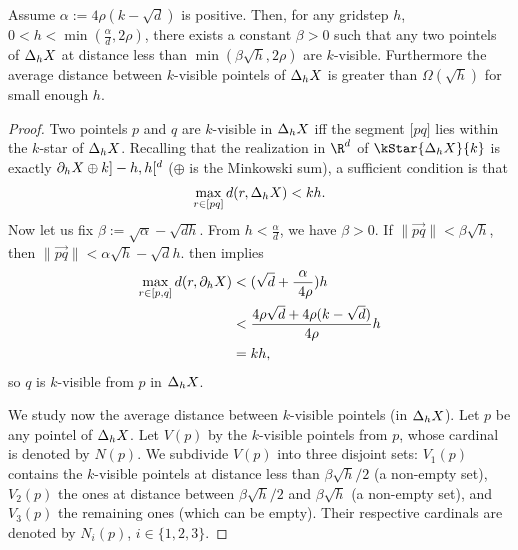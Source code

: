 \begin{theorem}
    \label{thm-k-visibility-distance}
    Assume $\alpha:=4\rho(k-\sqrt{d})$ is positive. Then, for any
    gridstep $h$, $0< h < \min(\frac{\alpha}{d}, 2\rho)$, there exists a
    constant $\beta >0 $ such that any two pointels of $\Delta_{h} {X}$ at
    distance less than $\min(\beta \sqrt{h},2\rho)$ are $k$-visible.
    Furthermore the average distance between $k$-visible pointels of
    $\Delta_{h} {X}$ is greater than $\Omega(\sqrt{h})$ for small enough
    $h$.
\end{theorem}
\begin{proof}
    Two pointels $p$ and $q$ are $k$-visible in $\Delta_{h} {X}$ iff the
    segment $\lbrack p q \rbrack$ lies within the $k$-star of
    $\Delta_{h} {X}$. Recalling that the realization in $\R^d$ of
    $\kStar{\DBh{h}{X}}{k}$ is exactly $\partial_{h} {X} \oplus k\rbrack -h, h
    \lbrack^d$ ($\oplus$ is the Minkowski sum), a sufficient condition
    is that
    \begin{align*}
        \max_{r \in \lbrack p q \rbrack} d(r,\Delta_{h} {X}) < kh.
    \end{align*}
    Now let us fix $\beta:=\sqrt{\alpha}-\sqrt{dh}$. From $h <
    \frac{\alpha}{d}$, we have $\beta > 0$. If $\|\vec{pq}\| < \beta
    \sqrt{h}$, then $\|\vec{pq}\| < \alpha \sqrt{h} - \sqrt{d}h$.
     then implies
    \begin{align*}
        \max_{r \in \lbrack p, q \rbrack} d( r, \partial_{h} {X}) & < (\sqrt{d}+\frac{\alpha}{\
            4\rho})h \\
        & < \frac{4\rho\sqrt{d}+4\rho(k-\sqrt{d})}{4\rho}h\\
        & = kh,
    \end{align*}
    so $q$ is $k$-visible from $p$ in $\Delta_{h} {X}$.

    We study now the average distance between $k$-visible pointels (in
    $\Delta_{h} {X}$). Let $p$ be any pointel of $\Delta_{h} {X}$. Let $V(p)$
    by the $k$-visible pointels from $p$, whose cardinal
    is denoted by $N(p)$. We subdivide $V(p)$ into three disjoint sets:
    $V_1(p)$ contains the $k$-visible pointels at distance less than
    $\beta \sqrt{h}/2$ (a non-empty set), $V_2(p)$ the ones at distance between $\beta
    \sqrt{h}/2$  and $\beta \sqrt{h}$ (a non-empty
    set), and $V_3(p)$ the remaining ones (which can be empty). Their
    respective cardinals are denoted by $N_i(p)$, $i\in \{1,2,3\}$.


\end{proof}
